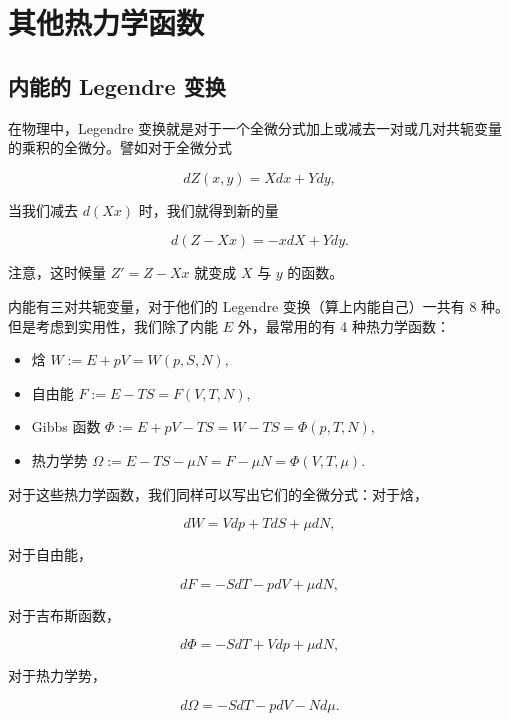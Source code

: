 \section{其他热力学函数}
\subsection{内能的 Legendre 变换}
在物理中，Legendre 变换就是对于一个全微分式加上或减去一对或几对共轭变量的乘积的全微分。譬如对于全微分式 \begin{linenomath}\begin{equation}dZ(x,y) = Xdx + Ydy,\end{equation}\end{linenomath} 当我们减去 $d(Xx)$ 时，我们就得到新的量 \begin{linenomath}\begin{equation}d(Z-Xx) = -xdX + Ydy.\end{equation}\end{linenomath} 注意，这时候量 $Z' = Z -Xx$ 就变成 $X$ 与 $y$ 的函数。

内能有三对共轭变量，对于他们的 Legendre 变换（算上内能自己）一共有 8 种。但是考虑到实用性，我们除了内能 $E$ 外，最常用的有 4 种热力学函数：
\begin{itemize}
    \item 焓 $W := E+pV = W(p,S,N),$
    \item 自由能 $F := E-TS = F(V,T,N),$
    \item Gibbs 函数 $\Phi := E+pV-TS = W-TS = \Phi(p,T,N),$
    \item 热力学势 $\Omega := E-TS-\mu N = F-\mu N = \Phi(V,T,\mu).$
\end{itemize}
对于这些热力学函数，我们同样可以写出它们的全微分式：对于焓，
\begin{linenomath}\begin{equation}
dW = Vdp+TdS+\mu dN,
\end{equation}\end{linenomath}对于自由能，
\begin{linenomath}\begin{equation}
dF = -SdT-pdV+\mu dN,
\end{equation}\end{linenomath}对于吉布斯函数，
\begin{linenomath}\begin{equation}
d\Phi = -SdT + Vdp + \mu dN,
\end{equation}\end{linenomath}对于热力学势，
\begin{linenomath}\begin{equation}
d\Omega = -SdT - pdV - Nd \mu.
\end{equation}\end{linenomath}

